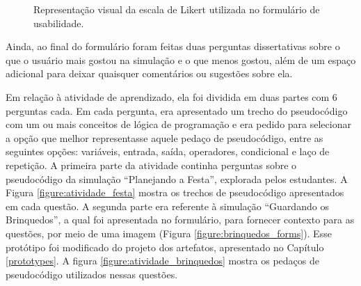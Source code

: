 \begin{figure}[h!]
    \centering
    \setlength{\fboxrule}{0.1pt} %
    \caption{Representação visual da escala de Likert utilizada no formulário de usabilidade.}
    \label{figure:likert_forms}
\end{figure}

Ainda, ao final do formulário foram feitas duas perguntas dissertativas sobre o que o usuário mais gostou na simulação e o que menos gostou, além de um espaço adicional para deixar quaisquer comentários ou sugestões sobre ela.

Em relação à atividade de aprendizado, ela foi dividida em duas partes com 6 perguntas cada. Em cada pergunta, era apresentado um trecho do pseudocódigo com um ou mais conceitos de lógica de programação e era pedido para selecionar a opção que melhor representasse aquele pedaço de pseudocódigo, entre as seguintes opções: variáveis, entrada, saída, operadores, condicional e laço de repetição. A primeira parte da atividade continha perguntas sobre o pseudocódigo da simulação \enquote{Planejando a Festa}, explorada pelos estudantes. A Figura \ref{figure:atividade_festa} mostra os trechos de pseudocódigo apresentados em cada questão. A segunda parte era referente à simulação \enquote{Guardando os Brinquedos}, a qual foi apresentada no formulário, para fornecer contexto para as questões, por meio de uma imagem (Figura \ref{figure:brinquedos_forms}). Esse protótipo foi modificado do projeto dos artefatos, apresentado no Capítulo \ref{prototypes}. A figura \ref{figure:atividade_brinquedos} mostra os pedaços de pseudocódigo utilizados nessas questões.

